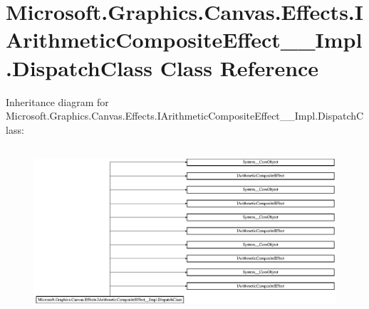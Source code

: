 \hypertarget{class_microsoft_1_1_graphics_1_1_canvas_1_1_effects_1_1_i_arithmetic_composite_effect_____impl_1_1_dispatch_class}{}\section{Microsoft.\+Graphics.\+Canvas.\+Effects.\+I\+Arithmetic\+Composite\+Effect\+\_\+\+\_\+\+Impl.\+Dispatch\+Class Class Reference}
\label{class_microsoft_1_1_graphics_1_1_canvas_1_1_effects_1_1_i_arithmetic_composite_effect_____impl_1_1_dispatch_class}
Inheritance diagram for Microsoft.\+Graphics.\+Canvas.\+Effects.\+I\+Arithmetic\+Composite\+Effect\+\_\+\+\_\+\+Impl.\+Dispatch\+Class\+:\begin{figure}[H]
\begin{center}
\leavevmode
\includegraphics[height=6.260162cm]{class_microsoft_1_1_graphics_1_1_canvas_1_1_effects_1_1_i_arithmetic_composite_effect_____impl_1_1_dispatch_class}
\end{center}
\end{figure}
